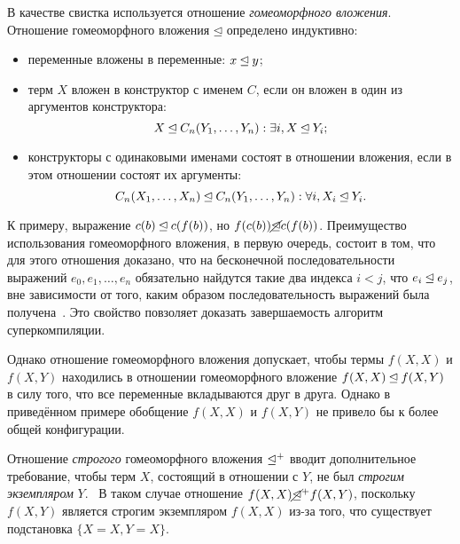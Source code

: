 В качестве свистка используется отношение \emph{гомеоморфного вложения}.\cite{scGen}
Отношение гомеоморфного вложения $\unlhd$ определено индуктивно:
\begin{itemize}
\item переменные вложены в переменные: $x \unlhd y$;
\item терм $X$ вложен в конструктор с именем $C$, если он вложен в один из аргументов конструктора:
      $$X \unlhd C_n(Y_1, \dots, Y_n): \exists i, X \unlhd Y_i;$$
\item конструкторы с одинаковыми именами состоят в отношении вложения, если в этом отношении
      состоят их аргументы:
      $$C_n(X_1, \dots, X_n) \unlhd C_n(Y_1, \dots, Y_n): \forall i, X_i \unlhd Y_i.$$
\end{itemize}

К примеру, выражение $c(b) \unlhd c(f(b))$, но $f(c(b)) \cancel{\unlhd} c(f(b))$.
Преимущество использования гомеоморфного вложения, в первую очередь, состоит в том,
что для этого отношения доказано, что на бесконечной последовательности выражений $e_0, e_1, \dots, e_n$
обязательно найдутся такие два индекса $i < j$, что $e_i \unlhd e_j$, вне зависимости
от того, каким образом последовательность выражений была получена~\cite{scPos}.
Это свойство повзоляет доказать завершаемость алгоритм суперкомпиляции.

Однако отношение гомеоморфного вложения допускает, чтобы термы $f(X, X)$ и $f(X, Y)$
находились в отношении гомеоморфного вложение $f(X, X) \unlhd f(X, Y)$ в силу того,
что все переменные вкладываются друг в друга. Однако в приведённом примере обобщение
$f(X, X)$ и $f(X, Y)$ не привело бы к более общей конфигурации.

Отношение \emph{строгого} гомеоморфного вложения $\unlhd^+$ вводит дополнительное
требование, чтобы терм $X$, состоящий в отношении с $Y$, не был \emph{строгим экземпляром} $Y$.~\cite{homeo}
В таком случае отношение $f(X, X) \cancel{\unlhd}^+ f(X, Y)$, поскольку $f(X, Y)$ является строгим
экземпляром $f(X, X)$ из-за того, что существует подстановка $\{ X = X, Y = X \}$.
